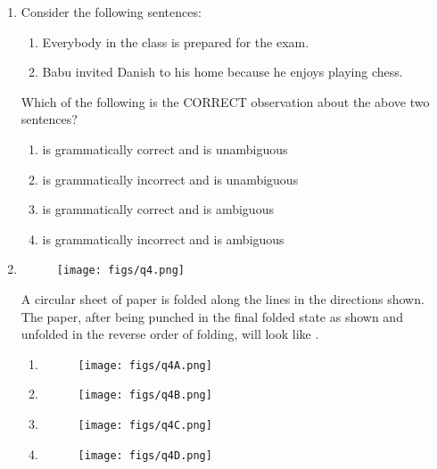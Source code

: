 \documentclass[a4paper, 11pt]{article}
\begin{document}
\begin{enumerate}
    \item Consider the following sentences:
    \begin{enumerate}[label=(\roman*)]
    \centering
        \item Everybody in the class is prepared for the exam.
        \item Babu invited Danish to his home because he enjoys playing chess.
    \end{enumerate}
    Which of the following is the CORRECT observation about the above two sentences?
    \begin{enumerate}
        \item {} is grammatically correct and  is unambiguous
        \item {} is grammatically incorrect and  is unambiguous
        \item {} is grammatically correct and  is ambiguous
        \item {} is grammatically incorrect and  is ambiguous
    \end{enumerate}
    \hfill{}

    \item 
    \begin{figure}[h]
        \centering
        \texttt{[image: figs/q4.png]}
        \label{fig:q4}
    \end{figure}
    
    A circular sheet of paper is folded along the lines in the directions shown. The paper, after being punched in the final folded state as shown and unfolded in the reverse order of folding, will look like \underline{\hspace{2cm}}.
    \begin{enumerate}
        \item 
        \begin{figure}[H]
            \centering
            \texttt{[image: figs/q4A.png]}
            \label{fig:placeholder}
        \end{figure}
        \item
        \begin{figure}[H]
            \centering
            \texttt{[image: figs/q4B.png]}
            \label{fig:placeholder}
        \end{figure}
        \item
        \begin{figure}[H]
            \centering
            \texttt{[image: figs/q4C.png]}
            \label{fig:placeholder}
        \end{figure}
        \item
        \begin{figure}[H]
            \centering
            \texttt{[image: figs/q4D.png]}
            \label{fig:placeholder}
        \end{figure}
    \end{enumerate}
    \hfill{}


\end{enumerate}
\end{document}
